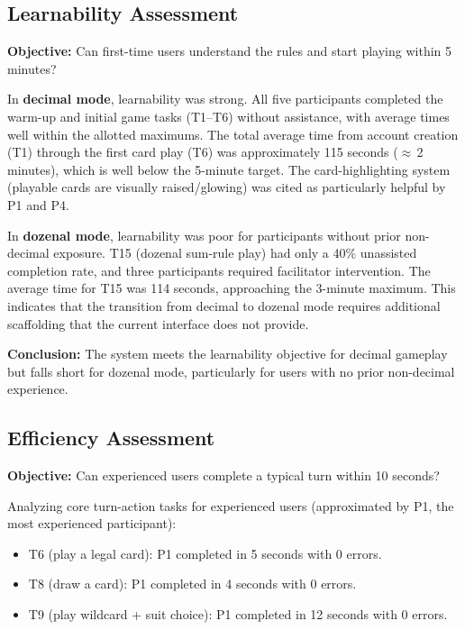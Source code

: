 \documentclass[12pt, titlepage]{article}
\begin{document}
\subsection{Learnability Assessment}

\textbf{Objective:} Can first-time users understand the rules and start playing within 5 minutes?

In \textbf{decimal mode}, learnability was strong. All five participants completed the warm-up and initial game tasks (T1--T6) without assistance, with average times well within the allotted maximums. The total average time from account creation (T1) through the first card play (T6) was approximately 115 seconds (${\approx}$\,2 minutes), which is well below the 5-minute target. The card-highlighting system (playable cards are visually raised/glowing) was cited as particularly helpful by P1 and P4.

In \textbf{dozenal mode}, learnability was poor for participants without prior non-decimal exposure. T15 (dozenal sum-rule play) had only a 40\% unassisted completion rate, and three participants required facilitator intervention. The average time for T15 was 114 seconds, approaching the 3-minute maximum. This indicates that the transition from decimal to dozenal mode requires additional scaffolding that the current interface does not provide.

\textbf{Conclusion:} The system meets the learnability objective for decimal gameplay but falls short for dozenal mode, particularly for users with no prior non-decimal experience.

\subsection{Efficiency Assessment}

\textbf{Objective:} Can experienced users complete a typical turn within 10 seconds?

Analyzing core turn-action tasks for experienced users (approximated by P1, the most experienced participant):
\begin{itemize}
  \item T6 (play a legal card): P1 completed in 5 seconds with 0 errors.
  \item T8 (draw a card): P1 completed in 4 seconds with 0 errors.
  \item T9 (play wildcard + suit choice): P1 completed in 12 seconds with 0 errors.
\end{itemize}
\end{document}
